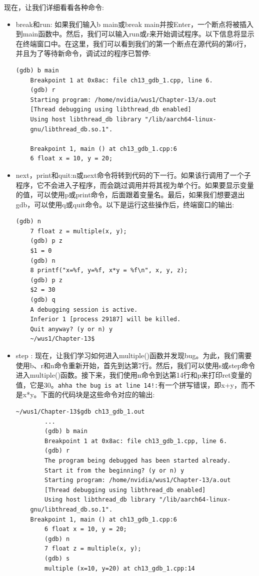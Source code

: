 现在，让我们详细看看各种命令: \par
\begin{itemize}
	\item break和run: 如果我们输入b main或break main并按Enter，一个断点将被插入到main函数中。然后，我们可以输入run或r来开始调试程序。以下信息将显示在终端窗口中。在这里，我们可以看到我们的第一个断点在源代码的第6行，并且为了等待新命令，调试过的程序已暂停:
	\begin{lstlisting}[caption={}]
	(gdb) b main
	Breakpoint 1 at 0x8ac: file ch13_gdb_1.cpp, line 6.
	(gdb) r
	Starting program: /home/nvidia/wus1/Chapter-13/a.out
	[Thread debugging using libthread_db enabled]
	Using host libthread_db library "/lib/aarch64-linux-
	gnu/libthread_db.so.1".
	
	Breakpoint 1, main () at ch13_gdb_1.cpp:6
	6 float x = 10, y = 20;
	\end{lstlisting}
	\item next，print和quit:n或next命令将转到代码的下一行。如果该行调用了一个子程序，它不会进入子程序，而会跳过调用并将其视为单个行。如果要显示变量的值，可以使用p或print命令，后面跟着变量名。最后，如果我们想要退出gdb，可以使用q或quit命令。以下是运行这些操作后，终端窗口的输出:
	\begin{lstlisting}[caption={}]
	(gdb) n
	7 float z = multiple(x, y);
	(gdb) p z
	$1 = 0
	(gdb) n
	8 printf("x=%f, y=%f, x*y = %f\n", x, y, z);
	(gdb) p z
	$2 = 30
	(gdb) q
	A debugging session is active.
	Inferior 1 [process 29187] will be killed.
	Quit anyway? (y or n) y
	~/wus1/Chapter-13$
	\end{lstlisting}
	\item step : 现在，让我们学习如何进入multiple()函数并发现bug。为此，我们需要使用b、r和n命令重新开始，首先到达第7行。然后，我们可以使用s或step命令进入multiple()函数。接下来，我们使用n命令到达第14行和p来打印ret变量的值，它是30。\texttt{ahha the bug is at line 14!:}有一个拼写错误，即x+y，而不是x*y。下面的代码块是这些命令对应的输出:
	\begin{lstlisting}[caption={}]
	~/wus1/Chapter-13$gdb ch13_gdb_1.out
		...
		(gdb) b main
		Breakpoint 1 at 0x8ac: file ch13_gdb_1.cpp, line 6.
		(gdb) r
		The program being debugged has been started already.
		Start it from the beginning? (y or n) y
		Starting program: /home/nvidia/wus1/Chapter-13/a.out
		[Thread debugging using libthread_db enabled]
		Using host libthread_db library "/lib/aarch64-linux-
	gnu/libthread_db.so.1".
	Breakpoint 1, main () at ch13_gdb_1.cpp:6
		6 float x = 10, y = 20;
		(gdb) n
		7 float z = multiple(x, y);
		(gdb) s
		multiple (x=10, y=20) at ch13_gdb_1.cpp:14

\end{lstlisting}
\end{itemize}
